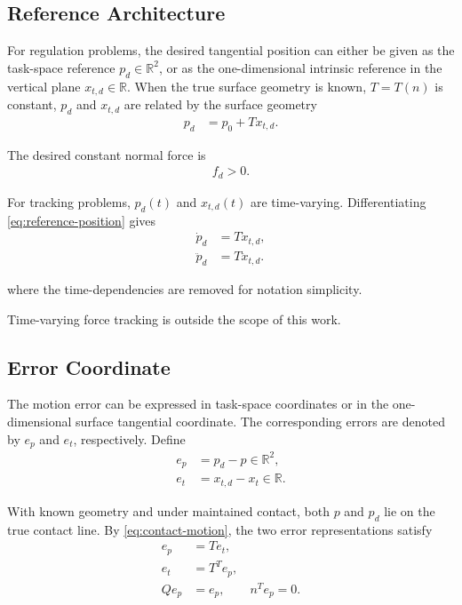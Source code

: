 \documentclass[10pt,journal,letterpaper]{IEEEtran}
\begin{document}
\subsection{Reference Architecture}

For regulation problems, the desired tangential position can either be given as the task-space reference $p_{d} \in \mathbb{R}^2$, or as the one-dimensional intrinsic reference in the vertical plane $x_{t,d}\in\mathbb{R}$. When the true surface geometry is known, $T=T(n)$ is constant, $p_{d}$ and $x_{t,d}$ are related by the surface geometry
\begin{equation}\label{eq:reference-position}
\begin{aligned}
p_{d} & = p_{0}+Tx_{t,d}.
\end{aligned}
\end{equation}

The desired constant normal force is 
\begin{align*}
f_{d}>0.
\end{align*}

For tracking problems, $p_d(t)$ and $x_{t,d}(t)$ are time-varying. Differentiating \eqref{eq:reference-position} gives
\begin{align*}
\dot p_d&=T\dot x_{t,d},\\
\ddot p_d&=T\ddot x_{t,d}.
\end{align*}

 where the time-dependencies are removed for notation simplicity. 
 
Time-varying force tracking is outside the scope of this work.

\subsection{Error Coordinate}

The motion error can be expressed in task-space coordinates or in the one-dimensional surface tangential coordinate. The corresponding errors are denoted by $e_p$ and $e_t$, respectively. Define
\begin{equation}\label{eq:motion-errors}
\begin{aligned}
e_p&=p_{d}-p\in\mathbb R^2,\\
e_t&=x_{t,d}-x_t\in\mathbb R.
\end{aligned}
\end{equation}

With known geometry and under maintained contact, both $p$ and $p_d$ lie on the true contact line. By \eqref{eq:contact-motion}, the two error representations satisfy
\begin{equation}\label{eq:error-geometry}
\begin{aligned}
e_p&=Te_t,\\
e_t&=T^Te_p,\\
Qe_p&=e_p,\qquad n^Te_p=0.
\end{aligned}
\end{equation}
\end{document}
